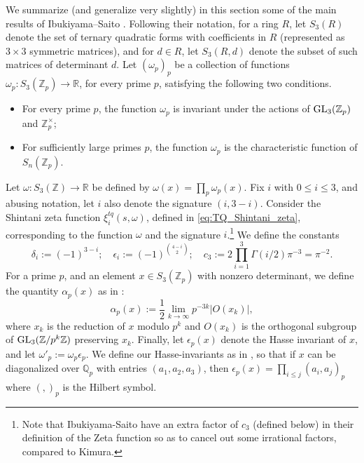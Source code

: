 \documentclass{article}
\def\binom#1#2{{#1\choose#2}}
\def\Z{{\mathbb Z}}
\def\GL{{\rm GL}}
\def\R{{\mathbb R}}
\def\Q{{\mathbb Q}}
\def\Z{{\mathbb Z}}
\def\Q{{\mathbb Q}}
\begin{document}
 We summarize (and generalize very slightly) in this section some of the main results of Ibukiyama--Saito \cite{ibukiyamasaitoI}. Following their notation, for a ring $R$, let $S_3(R)$ denote the set of ternary quadratic forms with coefficients in $R$ (represented as $3\times 3$
 symmetric matrices), and for $d\in R$, let $S_3(R,d)$ denote the subset of such matrices of determinant $d$. Let $(\omega_p)_p$ be a collection of functions $\omega_p:S_3(\Z_p)\to\R$, for every prime $p$, satisfying the following two conditions.
 \begin{itemize}
     \item[{\rm (1)}] For every prime $p$, the function $\omega_p$ is invariant under the actions of $\GL_3(\Z_p)$ and $\Z_p^{\times}$;
     \item[{\rm (2)}] For sufficiently large primes $p$, the function $\omega_p$ is the characteristic function of $S_n(\Z_p)$.
  \end{itemize}
Let $\omega:S_3(\Z)\to\R$ be defined by $\omega(x)=\prod_p\omega_p(x)$. Fix $i$ with $0\leq i\leq 3$, and abusing notation, let $i$ also denote the signature $(i,3-i)$. 
Consider the Shintani zeta function $\xi_i^{tq}(s,\omega)$, defined in \eqref{eq:TQ_Shintani_zeta}, corresponding to  the function $\omega$ and the signature $i$.\footnote{Note that Ibukiyama-Saito have an extra factor of $c_3$ (defined below) in their definition of the Zeta function so as to cancel out some irrational factors, compared to Kimura.} We define the constants
\begin{equation*}
\delta_i:=(-1)^{3-i};\quad \epsilon_i:=(-1)^{\binom{4-i}{2}}; \quad c_3:=2\displaystyle\prod_{i=1}^3\Gamma(i/2)\pi^{-3}=\pi^{-2}.
\end{equation*}
For a prime $p$, and an element $x\in S_3(\Z_p)$ with nonzero determinant, we define the quantity $\alpha_p(x)$ as in \cite[pp.1104]{ibukiyamasaitoI}:
 \begin{equation}\label{eq:def_alpha_p}
 \alpha_p(x):=\frac12\lim_{k\to\infty}p^{-3k}|O(x_k)|,
 \end{equation}
 where $x_k$ is the reduction of $x$ modulo $p^k$ and $O(x_k)$ is the orthogonal subgroup of $\GL_3(\Z/p^k\Z)$ preserving $x_k$.
 Finally, let $\epsilon_p(x)$ denote the Hasse invariant of $x$, and let $\omega'_p:=\omega_p\epsilon_p$. We define our Hasse-invariants as in \cite{ibukiyamasaitoI}, so that if $x$ can be diagonalized over $\Q_p$ with entries $(a_1,a_2,a_3)$, then $\epsilon_p(x)=\prod_{i\leq j} (a_i,a_j)_p$ where $(,)_p$ is the Hilbert symbol. 
\end{document}
